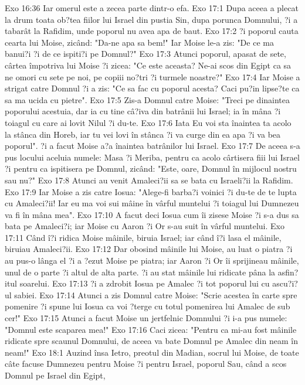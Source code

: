 Exo 16:36  Iar omerul este a zecea parte dintr-o efa.
Exo 17:1  Dupa aceea a plecat la drum toata ob?tea fiilor lui Israel din pustia Sin, dupa porunca Domnului, ?i a tabarât la Rafidim, unde poporul nu avea apa de baut.
Exo 17:2  ?i poporul cauta cearta lui Moise, zicând: "Da-ne apa sa bem!" Iar Moise le-a zis: "De ce ma banui?i ?i de ce ispiti?i pe Domnul?"
Exo 17:3  Atunci poporul, apasat de sete, cârtea împotriva lui Moise ?i zicea: "Ce este aceasta? Ne-ai scos din Egipt ca sa ne omori cu sete pe noi, pe copiii no?tri ?i turmele noastre?"
Exo 17:4  Iar Moise a strigat catre Domnul ?i a zis: "Ce sa fac cu poporul acesta? Caci pu?in lipse?te ca sa ma ucida cu pietre".
Exo 17:5  Zis-a Domnul catre Moise: "Treci pe dinaintea poporului acestuia, dar ia cu tine câ?iva din batrânii lui Israel; ia în mâna ?i toiagul cu care ai lovit Nilul ?i du-te.
Exo 17:6  Iata Eu voi sta înaintea ta acolo la stânca din Horeb, iar tu vei lovi în stânca ?i va curge din ea apa ?i va bea poporul". ?i a facut Moise a?a înaintea batrânilor lui Israel.
Exo 17:7  De aceea s-a pus locului aceluia numele: Masa ?i Meriba, pentru ca acolo cârtisera fiii lui Israel ?i pentru ca ispitisera pe Domnul, zicând: "Este, oare, Domnul în mijlocul nostru sau nu?"
Exo 17:8  Atunci au venit Amaleci?ii sa se bata cu Israeli?ii la Rafidim.
Exo 17:9  Iar Moise a zis catre Iosua: "Alege-fi barba?i voinici ?i du-te de te lupta cu Amaleci?ii! Iar eu ma voi sui mâine în vârful muntelui ?i toiagul lui Dumnezeu va fi în mâna mea".
Exo 17:10  A facut deci Iosua cum îi zisese Moise ?i s-a dus sa bata pe Amaleci?i; iar Moise cu Aaron ?i Or s-au suit în vârful muntelui.
Exo 17:11  Când î?i ridica Moise mâinile, biruia Israel; iar când î?i lasa el mâinile, biruiau Amaleci?ii.
Exo 17:12  Dar obosind mâinile lui Moise, au luat o piatra ?i au pus-o lânga el ?i a ?ezut Moise pe piatra; iar Aaron ?i Or îi sprijineau mâinile, unul de o parte ?i altul de alta parte. ?i au stat mâinile lui ridicate pâna la asfin?itul soarelui.
Exo 17:13  ?i a zdrobit Iosua pe Amalec ?i tot poporul lui cu ascu?i?ul sabiei.
Exo 17:14  Atunci a zis Domnul catre Moise: "Scrie acestea în carte spre pomenire ?i spune lui Iosua ca voi ?terge cu totul pomenirea lui Amalec de sub cer!"
Exo 17:15  Atunci a facut Moise un jertfelnic Domnului ?i i-a pus numele: "Domnul este scaparea mea!"
Exo 17:16  Caci zicea: "Pentru ca mi-au fost mâinile ridicate spre scaunul Domnului, de aceea va bate Domnul pe Amalec din neam în neam!"
Exo 18:1  Auzind însa Ietro, preotul din Madian, socrul lui Moise, de toate câte facuse Dumnezeu pentru Moise ?i pentru Israel, poporul Sau, când a scos Domnul pe Israel din Egipt,

